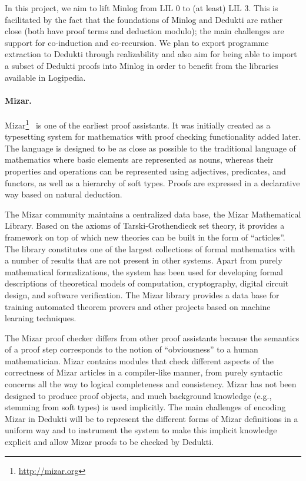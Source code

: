 In this project, we aim to lift Minlog from LIL $0$ to (at least) LIL $3$.
This is facilitated by the fact that the foundations of Minlog and Dedukti are
rather close (both have proof terms and deduction modulo); the main challenges
are support for co-induction and co-recursion. We plan to export programme
extraction to Dedukti through realizability and also aim for being able to
import a subset of Dedukti proofs into Minlog in order to benefit from the
libraries available in Logipedia.

\paragraph*{Mizar.}
Mizar\footnote{\url{http://mizar.org}}~\cite{banczerek:mizar} is one of the
earliest proof assistants. It was initially created as a typesetting system for
mathematics with proof checking functionality added later. The language is
designed to be as close as possible to the traditional language of mathematics
where basic elements are represented as nouns, whereas their properties and
operations can be represented using adjectives, predicates, and functors, as
well as a hierarchy of soft types. Proofs are expressed in a declarative way
based on natural deduction.

The Mizar community maintains a centralized data base, the Mizar Mathematical
Library. Based on the axioms of Tarski-Grothendieck set theory, it provides a
framework on top of which new theories can be built in the form of ``articles''.
The library constitutes one of the largest collections of formal mathematics with
a number of results that are not present in other systems. Apart from purely
mathematical formalizations, the system has been used for developing formal
descriptions of theoretical models of computation, cryptography, digital circuit
design, and software verification. The Mizar library provides a data base for
training automated theorem provers and other projects based on machine learning
techniques.

The Mizar proof checker differs from other proof assistants because the
semantics of a proof step corresponds to the notion of ``obviousness'' to a
human mathematician. Mizar contains modules that check different aspects of the
correctness of Mizar articles in a compiler-like manner, from purely syntactic
concerns all the way to logical completeness and consistency. Mizar has not been
designed to produce proof objects, and much background knowledge (e.g., stemming
from soft types) is used implicitly. The main challenges of encoding Mizar in
Dedukti will be to represent the different forms of Mizar definitions in a
uniform way and to instrument the system to make this implicit knowledge
explicit and allow Mizar proofs to be checked by Dedukti.

